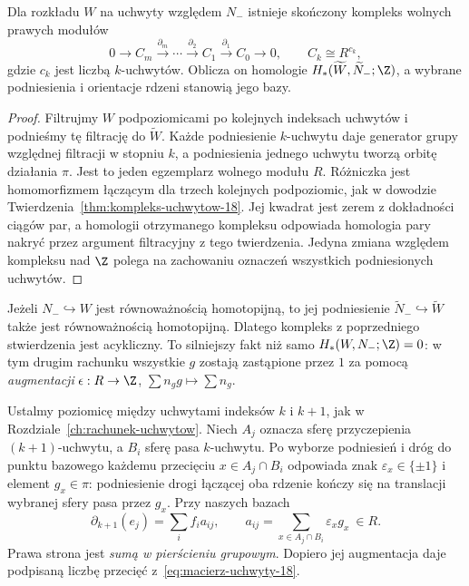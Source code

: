 \begin{stwierdzenie}
\label{prop:kompleks-pi-20}
Dla rozkładu $W$ na uchwyty względem $N_-$ istnieje
skończony kompleks wolnych prawych modułów
\[
 0\longrightarrow C_m\xrightarrow{\partial_m}\cdots
 \xrightarrow{\partial_2}C_1\xrightarrow{\partial_1}C_0
 \longrightarrow0,
 \qquad C_k\cong R^{c_k},
\]
gdzie $c_k$ jest liczbą $k$-uchwytów. Oblicza on homologie
$H_*(\widetilde W,\widetilde N_-;\Z)$, a wybrane podniesienia
i orientacje rdzeni stanowią jego bazy.
\end{stwierdzenie}
\begin{proof}
Filtrujmy $W$ podpoziomicami po kolejnych indeksach uchwytów
i podnieśmy tę filtrację do $\widetilde W$. Każde podniesienie
$k$-uchwytu daje generator grupy względnej filtracji w stopniu
$k$, a podniesienia jednego uchwytu tworzą orbitę działania
$\pi$. Jest to jeden egzemplarz wolnego modułu $R$.
Różniczka jest homomorfizmem łączącym dla trzech kolejnych
podpoziomic, jak w dowodzie
Twierdzenia~\ref{thm:kompleks-uchwytow-18}. Jej kwadrat
jest zerem z dokładności ciągów par, a homologii otrzymanego
kompleksu odpowiada homologia pary nakryć przez argument
filtracyjny z tego twierdzenia. Jedyna zmiana względem
kompleksu nad $\Z$ polega na zachowaniu oznaczeń wszystkich
podniesionych uchwytów.
\end{proof}

\begin{uwaga}
Jeżeli $N_-\hookrightarrow W$ jest równoważnością
homotopijną, to jej podniesienie
$\widetilde N_-\hookrightarrow\widetilde W$ także jest
równoważnością homotopijną. Dlatego kompleks z
poprzedniego stwierdzenia jest acykliczny. To silniejszy
fakt niż samo $H_*(W,N_-;\Z)=0$: w tym drugim rachunku
wszystkie $g$ zostają zastąpione przez $1$ za pomocą
\emph{augmentacji} $\epsilon:R\to\Z$, $\sum n_g g\mapsto
\sum n_g$.
\end{uwaga}

Ustalmy poziomicę między uchwytami indeksów $k$ i $k+1$,
jak w Rozdziale~\ref{ch:rachunek-uchwytow}. Niech $A_j$
oznacza sferę przyczepienia $(k+1)$-uchwytu, a $B_i$
sferę pasa $k$-uchwytu. Po wyborze podniesień i dróg
do punktu bazowego każdemu przecięciu $x\in A_j\cap B_i$
odpowiada znak $\varepsilon_x\in\{\pm1\}$ i element
$g_x\in\pi$: podniesienie drogi łączącej oba rdzenie
kończy się na translacji wybranej sfery pasa przez $g_x$.
Przy naszych bazach
\begin{equation}\label{eq:macierz-pi-20}
 \partial_{k+1}(e_j)=\sum_i f_i a_{ij},
 \qquad a_{ij}=\sum_{x\in A_j\cap B_i}\varepsilon_x g_x
 \ \in R.
\end{equation}
Prawa strona jest \emph{sumą w pierścieniu grupowym}.
Dopiero jej augmentacja daje podpisaną liczbę przecięć
z~\eqref{eq:macierz-uchwyty-18}.

